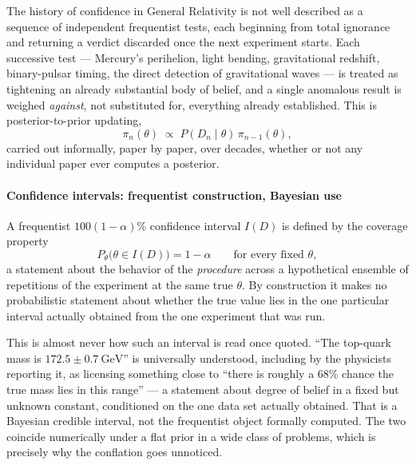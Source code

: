 The history of confidence in General Relativity is not well described as a
sequence of independent frequentist tests, each beginning from total ignorance
and returning a verdict discarded once the next experiment starts. Each
successive test --- Mercury's perihelion, light bending, gravitational
redshift, binary-pulsar timing, the direct detection of gravitational waves ---
is treated as tightening an already substantial body of belief, and a single
anomalous result is weighed \emph{against}, not substituted for, everything
already established. This is posterior-to-prior updating,
\begin{equation}
\pi_n(\theta) \;\propto\; P(D_n \mid \theta)\,\pi_{n-1}(\theta),
\end{equation}
carried out informally, paper by paper, over decades, whether or not any
individual paper ever computes a posterior.

\paragraph{Confidence intervals: frequentist construction, Bayesian use}

A frequentist $100(1-\alpha)\%$ confidence interval $I(D)$ is defined by the
coverage property
\begin{equation}
P_\theta\big(\theta \in I(D)\big) = 1-\alpha \qquad \text{for every fixed } \theta,
\end{equation}
a statement about the behavior of the \emph{procedure} across a hypothetical
ensemble of repetitions of the experiment at the same true $\theta$. By
construction it makes no probabilistic statement about whether the true value
lies in the one particular interval actually obtained from the one experiment
that was run.

\begin{remark}
This is almost never how such an interval is read once quoted. ``The top-quark
    mass is $172.5 \pm 0.7\ \mathrm{GeV}$'' is universally understood,
    including by the physicists reporting it, as licensing something close to
    ``there is roughly a 68\% chance the true mass lies in this range'' --- a
    statement about degree of belief in a fixed but unknown constant,
    conditioned on the one data set actually obtained. That is a Bayesian
    credible interval, not the frequentist object formally computed. The two
    coincide numerically under a flat prior in a wide class of problems, which
    is precisely why the conflation goes unnoticed.
\end{remark}


